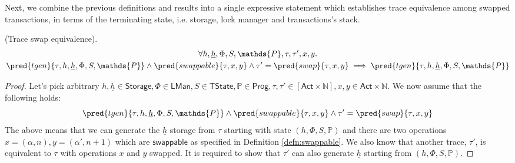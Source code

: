 Next, we combine the previous definitions and results into a single expressive statement which establishes trace equivalence among swapped transactions, in terms of the terminating state, i.e. storage, lock manager and transactions's stack.
\begin{lem}
	\label{lem:traceSwapEq}
	(Trace swap equivalence).
	\begin{gather*}
		\forall h, \underline{h}, \Phi, S, \mathds{P}, \tau, \tau', x, y \ldotp \\
		\pred{tgen}{\tau, h, \underline{h}, \Phi, S, \mathds{P}}
			\land
		\pred{swappable}{\tau, x, y}
			\land
		\tau' = \pred{swap}{\tau, x, y}
			\implies
		\pred{tgen}{\tau, h, \underline{h}, \Phi, S, \mathds{P}}
	\end{gather*}
	\begin{proof}
	Let's pick arbitrary $h, \underline{h} \in \mathsf{Storage}, \Phi \in \mathsf{LMan}, S \in \mathsf{TState}, \mathds{P} \in \mathsf{Prog}, \tau, \tau' \in [\mathsf{Act} \times \mathds{N}], x, y \in \mathsf{Act} \times \mathds{N}$. We now assume that the following holds:
	\[
		\pred{tgen}{\tau, h, \underline{h}, \Phi, S, \mathds{P}}
			\land
		\pred{swappable}{\tau, x, y}
			\land
		\tau' = \pred{swap}{\tau, x, y}
	\]
	The above means that we can generate the $\underline{h}$ storage from $\tau$ starting with state $(h, \Phi, S, \mathds{P})$ and there are two operations $x = (\alpha, n), y = (\alpha', n + 1)$ which are $\mathsf{swappable}$ as specified in Definition \ref{defn:swappable}. We also know that another trace, $\tau'$, is equivalent to $\tau$ with operations $x$ and $y$ swapped. It is required to show that $\tau'$ can also generate $\underline{h}$ starting from $(h, \Phi, S, \mathds{P})$.
	

\end{proof}
\end{lem}
